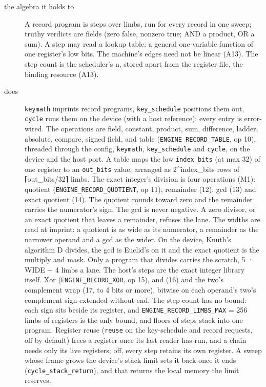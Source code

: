 \begin{description}
\item[{the algebra it holds to}] A record program is steps over limbs, run for every record in one sweep; truthy verdicts are fields (zero false, nonzero true; AND a product, OR a sum). A step may read a lookup table: a general one-variable function of one register's low bits. The machine's edges need not be linear (A13). The step count is the scheduler's n, stored apart from the register file, the binding resource (A13).
\item[{does}] \texttt{keymath} imprints record programs, \texttt{key\_\allowbreak{}schedule} positions them out, \texttt{cycle} runs them on the device (with a host reference); every entry is error-wired. The operations are field, constant, product, sum, difference, ladder, absolute, compare, signed field, and table (\texttt{ENGINE\_\allowbreak{}RECORD\_\allowbreak{}TABLE}, op 10), threaded through the config, \texttt{keymath}, \texttt{key\_\allowbreak{}schedule} and \texttt{cycle}, on the device and the host port. A table maps the low \texttt{index\_\allowbreak{}bits} (at max 32) of one register to an \texttt{out\_\allowbreak{}bits} value, arranged as 2\textasciicircum{}index\_\allowbreak{}bits rows of ⌈out\_\allowbreak{}bits/32⌉ limbs. The exact integer's division is four operations (M1): quotient (\texttt{ENGINE\_\allowbreak{}RECORD\_\allowbreak{}QUOTIENT}, op 11), remainder (12), gcd (13) and exact quotient (14). The quotient rounds toward zero and the remainder carries the numerator's sign. The gcd is never negative. A zero divisor, or an exact quotient that leaves a remainder, refuses the lane. The widths are read at imprint: a quotient is as wide as its numerator, a remainder as the narrower operand and a gcd as the wider. On the device, Knuth's algorithm D divides, the gcd is Euclid's on it and the exact quotient is the multiply and mask. Only a program that divides carries the scratch, 5 · WIDE + 4 limbs a lane. The host's steps are the exact integer library itself. Xor (\texttt{ENGINE\_\allowbreak{}RECORD\_\allowbreak{}XOR}, op 15), and (16) and the two's complement wrap (17, to 4 bits or more), bitwise on each operand's two's complement sign-extended without end. The step count has no bound: each sign sits beside its register, and \texttt{ENGINE\_\allowbreak{}RECORD\_\allowbreak{}LIMBS\_\allowbreak{}MAX} = 256 limbs of registers is the only bound, and floors of steps stack into one program. Register reuse (\texttt{reuse} on the key-schedule and record requests, off by default) frees a register once its last reader has run, and a chain needs only its live registers; off, every step retains its own register. A sweep whose frame grows the device's stack limit sets it back once it ends (\texttt{cycle\_\allowbreak{}stack\_\allowbreak{}return}), and that returns the local memory the limit reserves.

\end{description}
